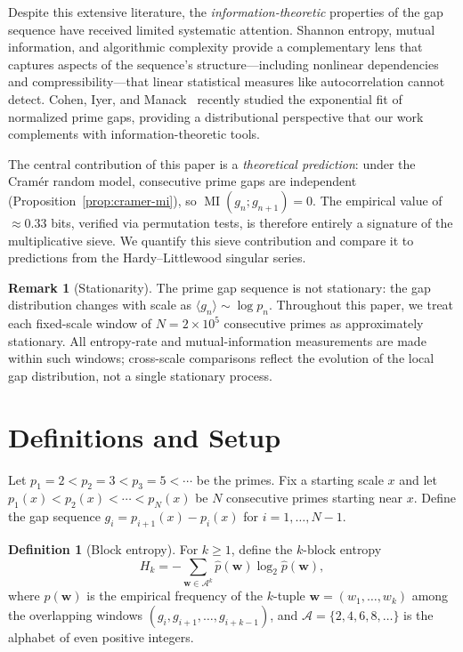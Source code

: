 \documentclass[11pt, a4paper]{amsart}
\theoremstyle{plain}
\theoremstyle{definition}
\newtheorem{definition}[theorem]{Definition}
\newtheorem{remark}[theorem]{Remark}
\newcommand{\MI}{\operatorname{MI}}
\begin{document}
Despite this extensive literature, the \emph{information-theoretic} properties of the gap sequence have received limited systematic attention.
Shannon entropy, mutual information, and algorithmic complexity provide a complementary lens that captures aspects of the sequence's structure---including nonlinear dependencies and compressibility---that linear statistical measures like autocorrelation cannot detect.
Cohen, Iyer, and Manack~\cite{Cohen2024} recently studied the exponential fit of normalized prime gaps, providing a distributional perspective that our work complements with information-theoretic tools.

The central contribution of this paper is a \emph{theoretical prediction}: under the Cram\'er random model, consecutive prime gaps are independent (Proposition~\ref{prop:cramer-mi}), so $\MI(g_n; g_{n+1}) = 0$.
The empirical value of $\approx 0.33$ bits, verified via permutation tests, is therefore entirely a signature of the multiplicative sieve.
We quantify this sieve contribution and compare it to predictions from the Hardy--Littlewood singular series.

\begin{remark}[Stationarity]
\label{rem:stationarity}
The prime gap sequence is not stationary: the gap distribution changes with scale as $\langle g_n \rangle \sim \log p_n$.
Throughout this paper, we treat each fixed-scale window of $N = 2 \times 10^5$ consecutive primes as approximately stationary.
All entropy-rate and mutual-information measurements are made within such windows; cross-scale comparisons reflect the evolution of the local gap distribution, not a single stationary process.
\end{remark}

\section{Definitions and Setup}
\label{sec:setup}

Let $p_1 = 2 < p_2 = 3 < p_3 = 5 < \cdots$ be the primes. Fix a starting scale $x$ and let $p_1(x) < p_2(x) < \cdots < p_N(x)$ be $N$ consecutive primes starting near $x$. Define the gap sequence $g_i = p_{i+1}(x) - p_i(x)$ for $i = 1, \ldots, N-1$.

\begin{definition}[Block entropy]
For $k \ge 1$, define the $k$-block entropy
\[
H_k = - \sum_{\mathbf{w} \in \mathcal{A}^k} \hat{p}(\mathbf{w}) \log_2 \hat{p}(\mathbf{w}),
\]
where $\hat{p}(\mathbf{w})$ is the empirical frequency of the $k$-tuple $\mathbf{w} = (w_1, \ldots, w_k)$ among the overlapping windows $(g_i, g_{i+1}, \ldots, g_{i+k-1})$, and $\mathcal{A} = \{2, 4, 6, 8, \ldots\}$ is the alphabet of even positive integers.
\end{definition}
\end{document}
